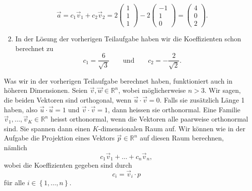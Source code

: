 \begin{losung*}
\begin{enumerate}[label=(\alph*)]
		\begin{equation*}
			\vec a
			=c_1\vec v_1+c_2\vec v_2
			=2\begin{pmatrix}
				1 \\ 1 \\ 1
			\end{pmatrix}
			-2\begin{pmatrix}
				-1 \\ 1 \\ 0
			\end{pmatrix}
			=\begin{pmatrix}
				4 \\ 0 \\ 2
			\end{pmatrix}.
		\end{equation*}
		\item In der Lösung der vorherigen Teilaufgabe haben wir die Koeffizienten schon berechnet zu
		\begin{equation*}
			c_1=\frac{6}{\sqrt{3}}
			\quad\quad\text{und}\quad\quad
			c_2=-\frac{2}{\sqrt{2}}.
		\end{equation*}
	\end{enumerate}
\end{losung*}

Was wir in der vorherigen Teilaufgabe berechnet haben, funktioniert auch in höheren Dimensionen.
Seien $\vec v,\vec w\in\mathbb R^n$, wobei möglicherweise $n>3$.
Wir sagen, die beiden Vektoren sind orthogonal, wenn $\vec u\cdot\vec v=0$.
Falls sie zusätzlich Länge 1 haben, also $\vec u\cdot\vec u=1$ und $\vec v\cdot\vec v=1$, dann heissen sie orthonormal.
Eine Familie $\vec v_1,\ldots,\vec v_K\in\mathbb R^n$ heisst orthonormal, wenn die Vektoren alle paarweise orthonormal sind.
Sie spannen dann einen $K$-dimensionalen Raum auf.
Wir können wie in der Aufgabe die Projektion eines Vektors $\vec p\in\mathbb R^n$ auf diesen Raum berechnen, nämlich
\begin{equation*}
	c_1\vec v_1+\ldots+c_n\vec v_n,
\end{equation*}
wobei die Koeffizienten gegeben sind durch
\begin{equation*}
	c_i=\vec v_i\cdot p
\end{equation*}
für alle $i\in\left\{1,\ldots,n\right\}$.


